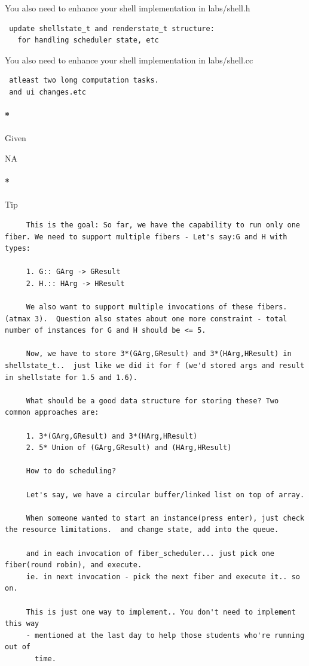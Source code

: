 \documentclass[]{article}
\let\oldparagraph\paragraph
\renewcommand{\paragraph}[1]{\oldparagraph{#1}\mbox{}}
\begin{document}
You also need to enhance your shell implementation in labs/shell.h

\begin{verbatim}
 update shellstate_t and renderstate_t structure:
   for handling scheduler state, etc
\end{verbatim}

You also need to enhance your shell implementation in labs/shell.cc

\begin{verbatim}
 atleast two long computation tasks.
 and ui changes.etc
\end{verbatim}

\paragraph*{Given}\label{given-6}

NA

\paragraph*{Tip}\label{tip-6}

\begin{verbatim}
     This is the goal: So far, we have the capability to run only one fiber. We need to support multiple fibers - Let's say:G and H with types:

     1. G:: GArg -> GResult
     2. H.:: HArg -> HResult

     We also want to support multiple invocations of these fibers. (atmax 3).  Question also states about one more constraint - total number of instances for G and H should be <= 5.

     Now, we have to store 3*(GArg,GResult) and 3*(HArg,HResult) in shellstate_t..  just like we did it for f (we'd stored args and result in shellstate for 1.5 and 1.6).

     What should be a good data structure for storing these? Two common approaches are:

     1. 3*(GArg,GResult) and 3*(HArg,HResult)
     2. 5* Union of (GArg,GResult) and (HArg,HResult)

     How to do scheduling?

     Let's say, we have a circular buffer/linked list on top of array.

     When someone wanted to start an instance(press enter), just check the resource limitations.  and change state, add into the queue.

     and in each invocation of fiber_scheduler... just pick one fiber(round robin), and execute.
     ie. in next invocation - pick the next fiber and execute it.. so on.

     This is just one way to implement.. You don't need to implement this way
     - mentioned at the last day to help those students who're running out of
       time.
\end{verbatim}
\end{document}
